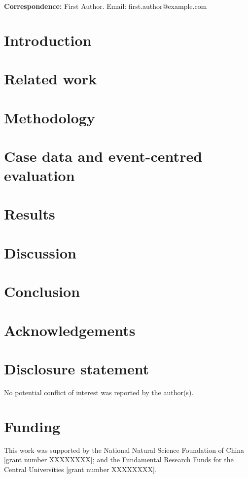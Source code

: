 \documentclass{tGIS2e}
\newcommand{\correspondence}[1]{\par\noindent\textbf{Correspondence:} #1}
\begin{document}
\ifijgisclass\else
\correspondence{First Author. Email: first.author@example.com}
\fi

\section{Introduction}


\section{Related work}


\section{Methodology}


\section{Case data and event-centred evaluation}


\section{Results}


\section{Discussion}


\section{Conclusion}


\section*{Acknowledgements}


\section*{Disclosure statement}
No potential conflict of interest was reported by the author(s).

\section*{Funding}
This work was supported by the National Natural Science Foundation of China
[grant number XXXXXXXX]; and the Fundamental Research Funds for the Central
Universities [grant number XXXXXXXX].
\end{document}
